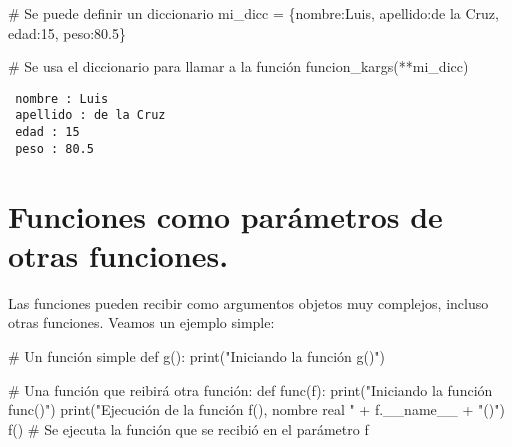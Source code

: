 \documentclass[
  letterpaper,
  DIV=11,
  numbers=noendperiod]{scrreprt}
\newenvironment{Shaded}{\begin{snugshade}}{\end{snugshade}}
\newcommand{\BuiltInTok}[1]{\textcolor[rgb]{0.00,0.23,0.31}{#1}}
\newcommand{\CommentTok}[1]{\textcolor[rgb]{0.37,0.37,0.37}{#1}}
\newcommand{\DecValTok}[1]{\textcolor[rgb]{0.68,0.00,0.00}{#1}}
\newcommand{\FloatTok}[1]{\textcolor[rgb]{0.68,0.00,0.00}{#1}}
\newcommand{\KeywordTok}[1]{\textcolor[rgb]{0.00,0.23,0.31}{#1}}
\newcommand{\NormalTok}[1]{\textcolor[rgb]{0.00,0.23,0.31}{#1}}
\newcommand{\OperatorTok}[1]{\textcolor[rgb]{0.37,0.37,0.37}{#1}}
\newcommand{\StringTok}[1]{\textcolor[rgb]{0.13,0.47,0.30}{#1}}
\newcommand{\VariableTok}[1]{\textcolor[rgb]{0.07,0.07,0.07}{#1}}
\begin{document}
\begin{Shaded}
\begin{Highlighting}[]
\CommentTok{\# Se puede definir un diccionario}
\NormalTok{mi\_dicc }\OperatorTok{=}\NormalTok{ \{}\StringTok{\textquotesingle{}nombre\textquotesingle{}}\NormalTok{:}\StringTok{\textquotesingle{}Luis\textquotesingle{}}\NormalTok{, }\StringTok{\textquotesingle{}apellido\textquotesingle{}}\NormalTok{:}\StringTok{\textquotesingle{}de la Cruz\textquotesingle{}}\NormalTok{, }\StringTok{\textquotesingle{}edad\textquotesingle{}}\NormalTok{:}\DecValTok{15}\NormalTok{, }\StringTok{\textquotesingle{}peso\textquotesingle{}}\NormalTok{:}\FloatTok{80.5}\NormalTok{\}}
\end{Highlighting}
\end{Shaded}

\begin{Shaded}
\begin{Highlighting}[]
\CommentTok{\# Se usa el diccionario para llamar a la función}
\NormalTok{funcion\_kargs(}\OperatorTok{**}\NormalTok{mi\_dicc)}
\end{Highlighting}
\end{Shaded}

\begin{verbatim}
 nombre : Luis
 apellido : de la Cruz
 edad : 15
 peso : 80.5
\end{verbatim}


\chapter{Funciones como parámetros de otras
funciones.}\label{funciones-como-paruxe1metros-de-otras-funciones.}

Las funciones pueden recibir como argumentos objetos muy complejos,
incluso otras funciones. Veamos un ejemplo simple:

\begin{Shaded}
\begin{Highlighting}[]
\CommentTok{\# Un función simple}
\KeywordTok{def}\NormalTok{ g():}
    \BuiltInTok{print}\NormalTok{(}\StringTok{"Iniciando la función \textquotesingle{}g()\textquotesingle{}"}\NormalTok{)}

\CommentTok{\# Una función que reibirá otra función:}
\KeywordTok{def}\NormalTok{ func(f):}
    \BuiltInTok{print}\NormalTok{(}\StringTok{"Iniciando la función \textquotesingle{}func()\textquotesingle{}"}\NormalTok{)}
    \BuiltInTok{print}\NormalTok{(}\StringTok{"Ejecución de la función \textquotesingle{}f()\textquotesingle{}, nombre real \textquotesingle{}"} \OperatorTok{+}\NormalTok{ f.}\VariableTok{\_\_name\_\_} \OperatorTok{+} \StringTok{"()\textquotesingle{}"}\NormalTok{)}
\NormalTok{    f() }\CommentTok{\# Se ejecuta la función que se recibió en el parámetro f}
\end{Highlighting}
\end{Shaded}
\end{document}
